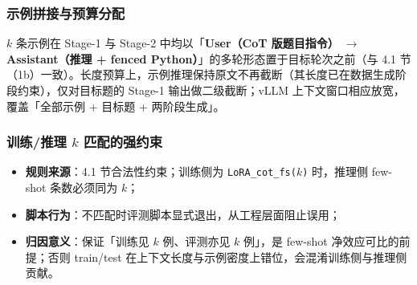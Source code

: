 \subsubsection{示例拼接与预算分配}
$k$ 条示例在 Stage-1 与 Stage-2 中均以「\textbf{User（CoT 版题目指令）} $\rightarrow$ \textbf{Assistant（推理 + fenced Python）}」的多轮形态置于目标轮次之前（与 4.1 节（1b）一致）。长度预算上，示例推理保持原文不再截断（其长度已在数据生成阶段约束），仅对目标题的 Stage-1 输出做二级截断；vLLM 上下文窗口相应放宽，覆盖「全部示例 + 目标题 + 两阶段生成」。

\subsubsection{训练/推理 $k$ 匹配的强约束}
\begin{itemize}
    \item \textbf{规则来源}：4.1 节合法性约束；训练侧为 \texttt{LoRA\_cot\_fs($k$)} 时，推理侧 few-shot 条数必须同为 $k$；
    \item \textbf{脚本行为}：不匹配时评测脚本显式退出，从工程层面阻止误用；
    \item \textbf{归因意义}：保证「训练见 $k$ 例、评测亦见 $k$ 例」，是 few-shot 净效应可比的前提；否则 train/test 在上下文长度与示例密度上错位，会混淆训练侧与推理侧贡献。
\end{itemize}